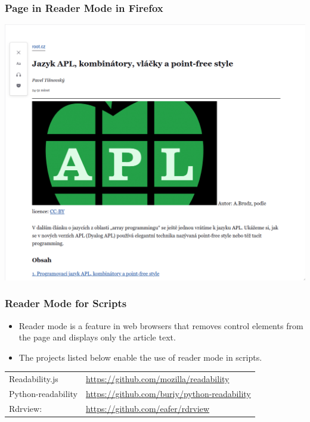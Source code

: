 \begin{frame}
  \frametitle{Page in Reader Mode in Firefox}
  \begin{center}
    \includegraphics[height=.7\textheight]{img/root-čtečka.png}
  \end{center}
\end{frame}

\begin{frame}
  \frametitle{Reader Mode for Scripts}
  \begin{itemize}
    \item Reader mode is a feature in web browsers that removes control elements from the page and displays only the article text.
    \item The projects listed below enable the use of reader mode in scripts.
  \end{itemize}

  \bigskip

  \begin{block}{}
    \begin{tabular}{ll}
      Readability.js & \url{https://github.com/mozilla/readability}\\
      Python-readability & \url{https://github.com/buriy/python-readability}\\
      Rdrview: & \url{https://github.com/eafer/rdrview}\\
    \end{tabular}
  \end{block}

\end{frame}

